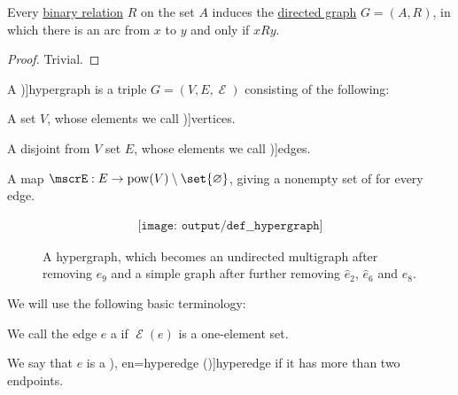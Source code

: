 \begin{proposition}\label{def:directed_graph_induced_by_relation}
  Every \hyperref[def:binary_relation]{binary relation} \( R \) on the set \( A \) induces the \hyperref[def:directed_graph]{directed graph} \( G = (A, R) \), in which there is an arc from \( x \) to \( y \) and only if \( x R y \).
\end{proposition}
\begin{proof}
  Trivial.
\end{proof}

\begin{definition}\label{def:hypergraph}
  A \term[ru=гиперграф (\cite[298]{ЕмеличевИПр1990ТеорияГрафов})]{hypergraph} is a triple \( G = (V, E, \mscrE) \) consisting of the following:
  \begin{thmenum}[series=def:hypergraph]
     A set \( V \), whose elements we call \term[ru=вершины (\cite[298]{ЕмеличевИПр1990ТеорияГрафов})]{vertices}.

     A disjoint from \( V \) set \( E \), whose elements we call \term[ru=рёбра (\cite[298]{ЕмеличевИПр1990ТеорияГрафов})]{edges}.

     A map \( \mscrE: E \to \pow(V) \setminus \set{ \varnothing } \), giving a nonempty set of  for every edge.
  \end{thmenum}

  \begin{figure}[!ht]
    \begin{equation}\label{eq:fig:def:hypergraph}
      \begin{aligned}
        \texttt{[image: output/def\_\_hypergraph]}
      \end{aligned}
    \end{equation}
    \caption{A hypergraph, which becomes an undirected multigraph after removing \( e_9 \) and a simple graph after further removing \( \widehat{e}_2 \), \( \widehat{e}_6 \) and \( e_8 \).}\label{fig:def:hypergraph}
  \end{figure}

  We will use the following basic terminology:
  \begin{thmenum}[resume=def:hypergraph]
     We call the edge \( e \) a  if \( \mscrE(e) \) is a one-element set.

     We say that \( e \) is a \term[ru=гипердуги (\cite[\S 7.1.5]{Новиков2013ДискретнаяМатематика}), en=hyperedge (\cite[7]{Bollobás1998ModernGraphTheory})]{hyperedge} if it has more than two endpoints.


\end{thmenum}
\end{definition}
